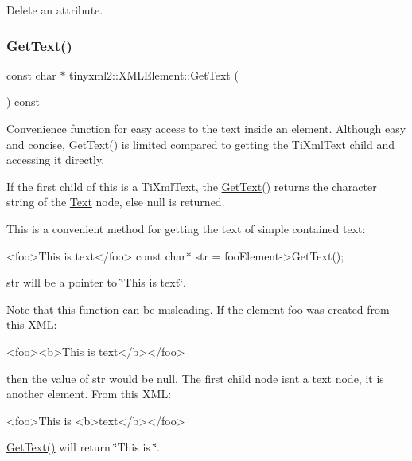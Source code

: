 Delete an attribute. \mbox{\label{classtinyxml2_1_1XMLElement_a0fa5bea0a4daf3ddd503dcabb823eba6}} 
\subsubsection{\texorpdfstring{Get\+Text()}{GetText()}\hspace{0.1cm}{\footnotesize\ttfamily [1/2]}}
{\footnotesize\ttfamily const char $\ast$ tinyxml2\+::\+X\+M\+L\+Element\+::\+Get\+Text (\begin{DoxyParamCaption}{ }\end{DoxyParamCaption}) const}

Convenience function for easy access to the text inside an element. Although easy and concise, \hyperlink{classtinyxml2_1_1XMLElement_a0fa5bea0a4daf3ddd503dcabb823eba6}{Get\+Text()} is limited compared to getting the Ti\+Xml\+Text child and accessing it directly.

If the first child of \textquotesingle{}this\textquotesingle{} is a Ti\+Xml\+Text, the \hyperlink{classtinyxml2_1_1XMLElement_a0fa5bea0a4daf3ddd503dcabb823eba6}{Get\+Text()} returns the character string of the \hyperlink{classText}{Text} node, else null is returned.

This is a convenient method for getting the text of simple contained text\+: \begin{DoxyVerb}<foo>This is text</foo>
    const char* str = fooElement->GetText();
\end{DoxyVerb}


\textquotesingle{}str\textquotesingle{} will be a pointer to \char`\"{}\+This is text\char`\"{}.

Note that this function can be misleading. If the element foo was created from this X\+ML\+: \begin{DoxyVerb}    <foo><b>This is text</b></foo>
\end{DoxyVerb}


then the value of str would be null. The first child node isn\textquotesingle{}t a text node, it is another element. From this X\+ML\+: \begin{DoxyVerb}    <foo>This is <b>text</b></foo>
\end{DoxyVerb}
 \hyperlink{classtinyxml2_1_1XMLElement_a0fa5bea0a4daf3ddd503dcabb823eba6}{Get\+Text()} will return \char`\"{}\+This is \char`\"{}. \mbox{\label{classtinyxml2_1_1XMLElement_a6d5c8d115561ade4e4456b71d91b6f51}} 
